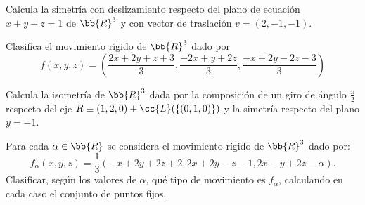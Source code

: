 \begin{ejercicio}
     Calcula la simetría con deslizamiento respecto del plano de ecuación $x + y + z = 1$ de $\bb{R}^3$ y con vector de traslación $v = (2, -1, -1)$.
\end{ejercicio}

\begin{ejercicio}
     Clasifica el movimiento rígido de $\bb{R}^3$ dado por
     \begin{equation*}
         f(x,y,z) = \left(
         \frac{2x+2y+z+3}{3}, \frac{-2x+y+2z}{3}, \frac{-x+2y-2z-3}{3}
         \right)
     \end{equation*}
\end{ejercicio}

\begin{ejercicio}
    Calcula la isometría de $\bb{R}^3$ dada por la composición de un giro de ángulo $\frac{\pi}{2}$ respecto del eje $R \equiv (1, 2, 0) + \cc{L}(\{(0, 1, 0)\})$ y la simetría respecto del plano $y = -1$.
\end{ejercicio}

\begin{ejercicio}
    Para cada $\alpha \in \bb{R}$ se considera el movimiento rígido de $\bb{R}^3$ dado por:
    \begin{equation*}
        f_\alpha(x,y,z)=\frac{1}{3}(-x + 2y + 2z + 2, 2x + 2y - z - 1, 2x - y + 2z - \alpha).
    \end{equation*}
    Clasificar, según los valores de $\alpha$, qué tipo de movimiento es $f_\alpha$, calculando en cada caso el conjunto de puntos fijos.
\end{ejercicio}

